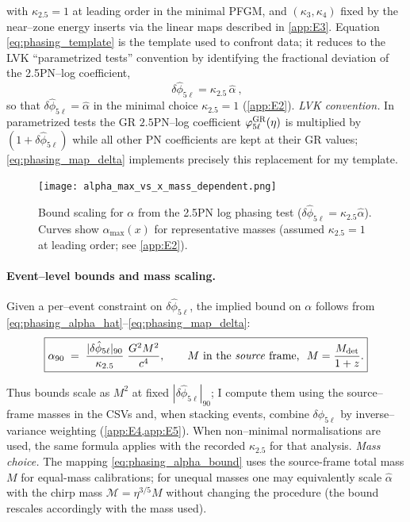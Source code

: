 \documentclass{iopjournal}
\begin{document}
with $\kappa_{2.5}=1$ at leading order in the minimal PFGM, and $(\kappa_{3},\kappa_{4})$ fixed by the near–zone energy inserts via the linear maps described in \cref{app:E3}. Equation \eqref{eq:phasing_template} is the template used to confront data; it reduces to the LVK ``parametrized tests” convention by identifying the fractional deviation of the 2.5PN–log coefficient,
\begin{equation}
\boxed{\ \delta\hat\phi_{5\ell}=\kappa_{2.5}\,\widehat\alpha\ } ,
\label{eq:phasing_map_delta}
\end{equation}
so that $\delta\hat\phi_{5\ell}=\widehat\alpha$ in the minimal choice $\kappa_{2.5}=1$ (\cref{app:E2}).
\noindent\emph{LVK convention.} In parametrized tests the GR $2.5$PN--log coefficient $\varphi_{5\ell}^{\rm GR}(\eta)$ is multiplied by $(1+\delta\hat\phi_{5\ell})$ while all other PN coefficients are kept at their GR values; \eqref{eq:phasing_map_delta} implements precisely this replacement for my template.


\begin{figure}[t]
\centering
\texttt{[image: alpha\_max\_vs\_x\_mass\_dependent.png]}
\caption{Bound scaling for \(\alpha\) from the 2.5PN log phasing test (\(\delta\hat\phi_{5\ell}=\kappa_{2.5}\widehat\alpha\)). Curves show \(\alpha_{\max}(x)\) for representative masses (assumed \(\kappa_{2.5}=1\) at leading order; see \cref{app:E2}).}
\label{fig:alpha-mass-scaling}
\end{figure}

\paragraph{Event–level bounds and mass scaling.}
Given a per–event constraint on $\delta\hat\phi_{5\ell}$, the implied bound on $\alpha$ follows from \eqref{eq:phasing_alpha_hat}–\eqref{eq:phasing_map_delta}:
\begin{equation}
\boxed{\alpha_{90}\;=\;\frac{|\delta\hat\phi_{5\ell}|_{90}}{\kappa_{2.5}}\;\frac{G^{2}M^{2}}{c^{4}},
\qquad
M\ \text{in the \emph{source} frame,}\ \ M=\frac{M_{\rm det}}{1+z}.}
\label{eq:phasing_alpha_bound}
\end{equation}

Thus bounds scale as $M^{2}$ at fixed $|\delta\hat\phi_{5\ell}|_{90}$; I compute them using the source–frame masses in the CSVs and, when stacking events, combine $\delta\hat\phi_{5\ell}$ by inverse–variance weighting (\cref{app:E4,app:E5}). When non–minimal normalisations are used, the same formula applies with the recorded $\kappa_{2.5}$ for that analysis.
\noindent\emph{Mass choice.} The mapping \eqref{eq:phasing_alpha_bound} uses the source-frame total mass $M$ for equal-mass calibrations; for unequal masses one may equivalently scale $\widehat\alpha$ with the chirp mass $\mathcal M=\eta^{3/5}M$ without changing the procedure (the bound rescales accordingly with the mass used).
\end{document}
